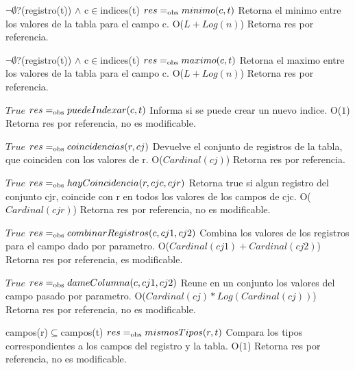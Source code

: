  {$\neg\emptyset$?(registro(t)) $\land$ c$\in$indices(t)}
 {$res =_{\mathrm{obs}} minimo(c,t)$}
 {Retorna el minimo entre los valores de la tabla para el campo c.}
 {O($L+Log(n)$)}
 {Retorna res por referencia.}
  
 {$\neg\emptyset$?(registro(t)) $\land$ c$\in$indices(t)}
 {$res =_{\mathrm{obs}} maximo(c,t)$}
 {Retorna el maximo entre los valores de la tabla para el campo c.}
 {O($L+Log(n)$)}
 {Retorna res por referencia.} 

 {$True$}
 {$res =_{\mathrm{obs}} puedeIndexar(c,t)$}
 {Informa si se puede crear un nuevo indice.}
 {O($1$)}
 {Retorna res por referencia, no es modificable.}

 {$True$}
 {$res =_{\mathrm{obs}} coincidencias(r,cj)$}
 {Devuelve el conjunto de registros de la tabla, que coinciden con los valores de r.}
 {O($Cardinal(cj)$)}
 {Retorna res por referencia.} 

 {$True$}
 {$res =_{\mathrm{obs}} hayCoincidencia(r,cjc,cjr)$}
 {Retorna true si algun registro del conjunto cjr, coincide con r en todos los valores de los campos de cjc.}
 {O($Cardinal(cjr)$)}
 {Retorna res por referencia, no es modificable.} 


 {$True$}
 {$res =_{\mathrm{obs}} combinarRegistros(c,cj1,cj2)$}
 {Combina los valores de los registros para el campo dado por parametro.}
 {O($Cardinal(cj1)+Cardinal(cj2)$)}
 {Retorna res por referencia, es modificable.}

 {$True$}
 {$res =_{\mathrm{obs}} dameColumna(c,cj1,cj2)$}
 {Reune en un conjunto los valores del campo pasado por parametro.}
 {O($Cardinal(cj)*Log(Cardinal(cj))$)}
 {Retorna res por referencia, no es modificable.} 

 {campos(r)$\subseteq$campos(t)}
 {$res =_{\mathrm{obs}} mismosTipos(r,t)$}
 {Compara los tipos correspondientes a los campos del registro y la tabla.}
 {O($1$)}
 {Retorna res por referencia, no es modificable.} 
 
